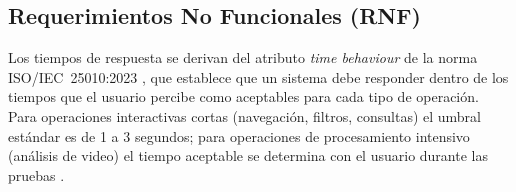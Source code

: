 \subsection{Requerimientos No Funcionales (RNF)}

Los tiempos de respuesta se derivan del atributo \textit{time behaviour} de la norma
ISO/IEC~25010:2023 \cite{iso25010}, que establece que un sistema debe responder dentro
de los tiempos que el usuario percibe como aceptables para cada tipo de operación. Para
operaciones interactivas cortas (navegación, filtros, consultas) el umbral estándar es
de 1 a 3 segundos; para operaciones de procesamiento intensivo (análisis de video) el
tiempo aceptable se determina con el usuario durante las pruebas \cite{iso25010}.

